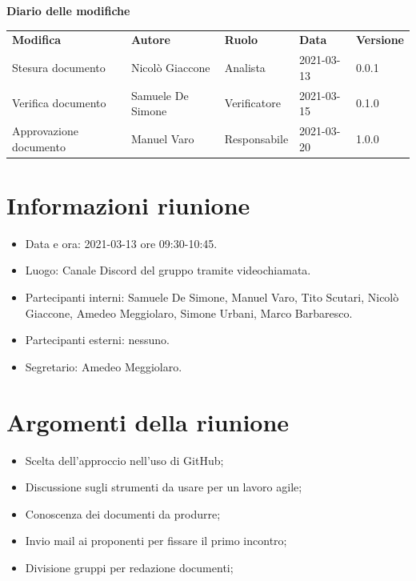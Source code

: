 \documentclass[a4paper]{article}
\begin{document}
        \begin{center}
            \textbf{\Large Diario delle modifiche}\\
            \vspace{10px}
            \begin{table}[h!]
            \centering
            \renewcommand{\arraystretch}{1.8}
            \begin{tabular}{p{150px} p{90px} p{50px} p{60px} p{45px}}
                \rowcolor{logo!70} \textbf{Modifica} & \textbf{Autore} & \textbf{Ruolo} & \textbf{Data} & \textbf{Versione}\\
                Stesura documento & Nicolò Giaccone & Analista & 2021-03-13 & 0.0.1\\   
                Verifica documento & Samuele De Simone & Verificatore & 2021-03-15 & 0.1.0\\  
                Approvazione documento & Manuel Varo & Responsabile & 2021-03-20 & 1.0.0\\ 
            \end{tabular}
        \end{table}
        \end{center}
    
        \newpage
        \tableofcontents
        \newpage

    \section{Informazioni riunione}
    \begin{itemize}
        \item Data e ora: 2021-03-13 ore 09:30-10:45.
        \item Luogo: Canale Discord del gruppo tramite videochiamata.
        \item Partecipanti interni: Samuele De Simone, Manuel Varo, Tito Scutari, Nicolò Giaccone, Amedeo Meggiolaro, Simone Urbani, Marco Barbaresco.
        \item Partecipanti esterni: nessuno.
        \item Segretario: Amedeo Meggiolaro.
    \end{itemize}
    \section{Argomenti della riunione}
    \begin{itemize}
        \item Scelta dell'approccio nell'uso di GitHub;
        \item Discussione sugli strumenti da usare per un lavoro agile;
        \item Conoscenza dei documenti da produrre;
        \item Invio mail ai proponenti per fissare il primo incontro;
        \item Divisione gruppi per redazione documenti;
    \end{itemize}
\end{document}
